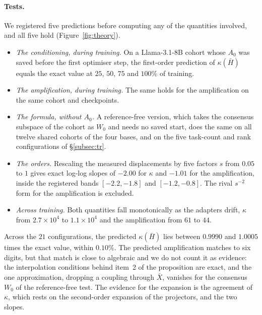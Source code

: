 \paragraph{Tests.} We registered five predictions before computing any of the
quantities involved, and all five hold (Figure~\ref{fig:theory}).
\begin{itemize}[leftmargin=*,itemsep=1pt,topsep=2pt]
\item \emph{The conditioning, during training.} On a Llama-3.1-8B cohort whose
  $A_0$ was saved before the first optimiser step, the first-order prediction
  of $\kappa(\bar H)$ equals the exact value at $25$, $50$, $75$ and $100\%$
  of training.
\item \emph{The amplification, during training.} The same holds for the
  amplification on the same cohort and checkpoints.
\item \emph{The formula, without $A_0$.} A reference-free version, which takes
  the consensus subspace of the cohort as $W_0$ and needs no saved start, does
  the same on all twelve shared cohorts of the four bases, and on the five
  task-count and rank configurations of \S\ref{subsec:tr}.
\item \emph{The orders.} Rescaling the measured displacements by five factors
  $s$ from $0.05$ to $1$ gives exact log-log slopes of $-2.00$ for
  $\kappa$ and $-1.01$ for the amplification, inside the registered bands
  $[-2.2, -1.8]$ and $[-1.2, -0.8]$. The rival $s^{-2}$ form for the
  amplification is excluded.
\item \emph{Across training.} Both quantities fall monotonically as the
  adapters drift, $\kappa$ from $2.7\times10^{4}$ to $1.1\times10^{4}$ and the
  amplification from $61$ to $44$.
\end{itemize}
Across the $21$ configurations, the predicted $\kappa(\bar H)$ lies between
$0.9990$ and $1.0005$ times the exact value, within $0.10\%$. The predicted
amplification matches to six digits, but that match is close to algebraic and
we do not count it as evidence: the interpolation conditions behind item~2 of
the proposition are exact, and the one approximation, dropping a coupling
through $\bar X$, vanishes for the consensus $W_0$ of the reference-free test.
The evidence for the expansion is the agreement of $\kappa$, which rests on the
second-order expansion of the projectors, and the two slopes.

